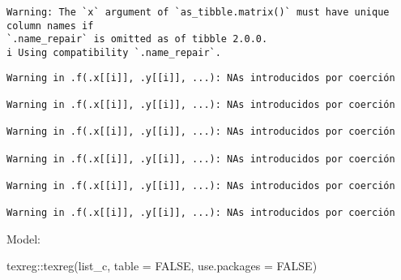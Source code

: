 \documentclass[
  letterpaper,
  DIV=11,
  numbers=noendperiod]{scrartcl}
\newenvironment{Shaded}{\begin{snugshade}}{\end{snugshade}}
\newcommand{\AttributeTok}[1]{\textcolor[rgb]{0.40,0.45,0.13}{#1}}
\newcommand{\ConstantTok}[1]{\textcolor[rgb]{0.56,0.35,0.01}{#1}}
\newcommand{\FunctionTok}[1]{\textcolor[rgb]{0.28,0.35,0.67}{#1}}
\newcommand{\NormalTok}[1]{\textcolor[rgb]{0.00,0.23,0.31}{#1}}
\newcommand{\SpecialCharTok}[1]{\textcolor[rgb]{0.37,0.37,0.37}{#1}}
\begin{document}
\begin{verbatim}
Warning: The `x` argument of `as_tibble.matrix()` must have unique column names if
`.name_repair` is omitted as of tibble 2.0.0.
i Using compatibility `.name_repair`.
\end{verbatim}

\begin{verbatim}
Warning in .f(.x[[i]], .y[[i]], ...): NAs introducidos por coerción

Warning in .f(.x[[i]], .y[[i]], ...): NAs introducidos por coerción

Warning in .f(.x[[i]], .y[[i]], ...): NAs introducidos por coerción

Warning in .f(.x[[i]], .y[[i]], ...): NAs introducidos por coerción

Warning in .f(.x[[i]], .y[[i]], ...): NAs introducidos por coerción

Warning in .f(.x[[i]], .y[[i]], ...): NAs introducidos por coerción
\end{verbatim}

Model:

\begin{Shaded}
\begin{Highlighting}[]
\NormalTok{texreg}\SpecialCharTok{::}\FunctionTok{texreg}\NormalTok{(list\_c, }\AttributeTok{table =} \ConstantTok{FALSE}\NormalTok{, }\AttributeTok{use.packages =} \ConstantTok{FALSE}\NormalTok{)}
\end{Highlighting}
\end{Shaded}
\end{document}
